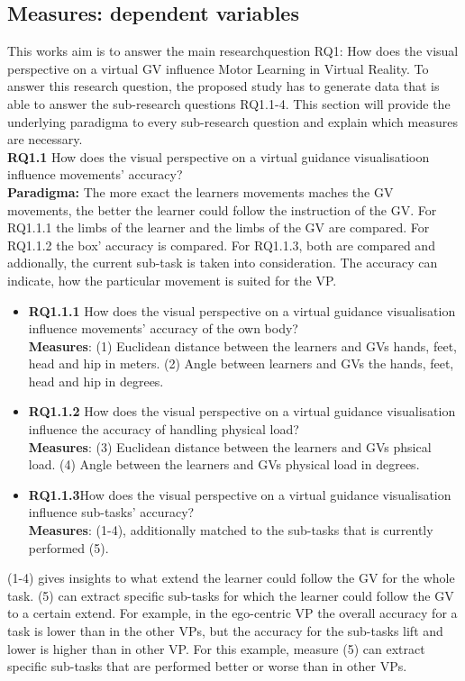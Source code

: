 \subsection{Measures: dependent variables}
\label{sec:measures}
This works aim is to answer the main researchquestion RQ1: How does the visual perspective on a virtual GV influence Motor Learning in Virtual Reality. To answer this research question, the proposed study has to generate data that is able to answer the sub-research questions RQ1.1-4. This section will provide the underlying paradigma to every sub-research question and explain which measures are necessary.\\

\textbf{RQ1.1} How does the visual perspective on a virtual guidance visualisatioon influence movements' accuracy?\\
\textbf{Paradigma:} The more exact the learners movements maches the GV movements, the better the learner could follow the instruction of the GV. For RQ1.1.1 the limbs of the learner and the limbs of the GV are compared. For RQ1.1.2 the box' accuracy is compared. For RQ1.1.3, both are compared and addionally, the current sub-task is taken into consideration. The accuracy can indicate, how the particular movement is suited for the VP.
\begin{itemize}
	\item[] \textbf{RQ1.1.1} How does the visual perspective on a virtual guidance visualisation influence movements' accuracy of the own body?\\
	\textbf{Measures}: (1) Euclidean distance between the learners and GVs hands, feet, head and hip in meters. (2) Angle between learners and GVs the hands, feet, head and hip in degrees.

	\item[] \textbf{RQ1.1.2} How does the visual perspective on a virtual guidance visualisation influence the accuracy of handling physical load?\\
	\textbf{Measures}: (3) Euclidean distance between the learners and GVs phsical load. (4) Angle between the learners and GVs physical load in degrees.

	\item[] \textbf{RQ1.1.3}How does the visual perspective on a virtual guidance visualisation influence sub-tasks' accuracy?\\
	\textbf{Measures}: (1-4), additionally matched to the sub-tasks that is currently performed (5).
\end{itemize}	
(1-4) gives insights to what extend the learner could follow the GV for the whole task. (5) can extract specific sub-tasks for which the learner could follow the GV to a certain extend. For example, in the ego-centric VP the overall accuracy for a task is lower than in the other VPs, but the accuracy for the sub-tasks lift and lower is higher than in other VP. For this example, measure (5) can extract specific sub-tasks that are performed better or worse than in other VPs.\\

